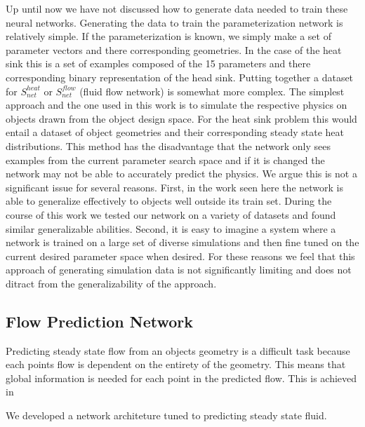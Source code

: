 \documentclass{article} %
\begin{document}
Up until now we have not discussed how to generate data needed to train these neural networks. Generating the data to train the parameterization network is relatively simple. If the parameterization is known, we simply make a set of parameter vectors and there corresponding geometries. In the case of the heat sink this is a set of examples composed of the 15 parameters and there corresponding binary representation of the head sink. Putting together a dataset for $S^{heat}_{net}$ or $S^{flow}_{net}$ (fluid flow network) is somewhat more complex. The simplest approach and the one used in this work is to simulate the respective physics on objects drawn from the object design space. For the heat sink problem this would entail a dataset of object geometries and their corresponding steady state heat distributions. This method has the disadvantage that the network only sees examples from the current parameter search space and if it is changed the network may not be able to accurately predict the physics. We argue this is not a significant issue for several reasons. First, in the work seen here the network is able to generalize effectively to objects well outside its train set. During the course of this work we tested our network on a variety of datasets and found similar generalizable abilities. Second, it is easy to imagine a system where a network is trained on a large set of diverse simulations and then fine tuned on the current desired parameter space when desired. For these reasons we feel that this approach of generating simulation data is not significantly limiting and does not ditract from the generalizability of the approach.

\subsection{Flow Prediction Network}

Predicting steady state flow from an objects geometry is a difficult task because each points flow is dependent on the entirety of the geometry. This means that global information is needed for each point in the predicted flow. This is achieved in 

We developed a network architeture tuned to predicting steady state fluid. 
\end{document}
